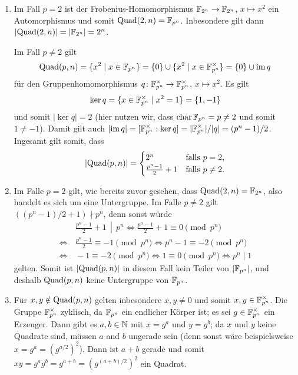\begin{solution}
  \begin{enumerate}
    \item
      Im Fall $p = 2$ ist der Frobenius-Homomorphismus $\mathbb{F}_{2^n} \to \mathbb{F}_{2^n}$, $x \mapsto x^2$ ein Automorphismus und somit $\operatorname{Quad}(2,n) = \mathbb{F}_{p^n}$.
      Inbesondere gilt dann $|{\operatorname{Quad}(2,n)}| = |\mathbb{F}_{2^n}| = 2^n$.
      
      Im Fall $p \neq 2$ gilt
      \[
          \operatorname{Quad}(p,n)
        = \{ x^2 \mid x \in \mathbb{F}_{p^n} \}
        = \{0\} \cup \{x^2 \mid x \in \mathbb{F}_{p^n}^\times\}
        = \{0\} \cup \operatorname{im} q
      \]
      für den Gruppenhomomorphismus $q \colon \mathbb{F}_{p^n}^\times \to \mathbb{F}_{p^n}^\times$, $x \mapsto x^2$.
      Es gilt
      \[
          \ker q
        = \{x \in \mathbb{F}_{p^n}^\times \mid x^2 = 1\}
        = \{1,-1\}
      \]
      und somit $|{\ker q}| = 2$ (hier nutzen wir, dass $\operatorname{char} \mathbb{F}_{p^n} = p \neq 2$ und somit $1 \neq -1$).
      Damit gilt auch $|{\operatorname{im} q}| = [\mathbb{F}_{p^n}^\times : \ker q] = |\mathbb{F}_{p^n}^\times|/|q| = (p^n - 1)/2$.
      Ingesamt gilt somit, dass
      \[
          |{\operatorname{Quad}(p,n)}| =
          \begin{cases}
            2^n                   & \text{falls $p = 2$},     \\
            \frac{p^n - 1}{2} + 1 & \text{falls $p \neq 2$}.
          \end{cases}
      \]
      
    \item
      Im Falle $p = 2$ gilt, wie bereits zuvor gesehen, dass $\operatorname{Quad}(2,n) = \mathbb{F}_{2^n}$, also handelt es sich um eine Untergruppe.
      Im Falle $p \neq 2$ gilt $((p^n - 1)/2 + 1) \nmid p^n$, denn sonst würde
      \begin{align*}
            &\, \left. \frac{p^n - 1}{2} + 1 \,\middle|\, p^n \right.
        \iff    \frac{p^n - 1}{2} + 1 \equiv 0 \pmod{p^n}
        \\
        \iff&\, \frac{p^n - 1}{2} \equiv - 1 \pmod{p^n}
        \iff    p^n - 1 \equiv -2 \pmod{p^n}
        \\
        \iff&\, -1 \equiv -2 \pmod{p^n}
        \iff    1 \equiv 0  \pmod{p^n}
        \iff    p^n \mid 1
      \end{align*}
      gelten.
      Somit  ist $|{\operatorname{Quad}(p,n)}|$ in diesem Fall kein Teiler von $|\mathbb{F}_{p^n}|$, und deshalb $\operatorname{Quad}(p,n)$ keine Untergruppe von $\mathbb{F}_{p^n}$.
      
    \item
      Für $x, y \notin \operatorname{Quad}(p,n)$ gelten inbesondere $x, y \neq 0$ und somit $x, y \in \mathbb{F}_{p^n}^\times$.
      Die Gruppe $\mathbb{F}_{p^n}^\times$ zyklisch, da $\mathbb{F}_{p^n}$ ein endlicher Körper ist;
      es sei $g \in \mathbb{F}_{p^n}^\times$ ein Erzeuger.
      Dann gibt es $a, b \in \mathbb{N}$ mit $x = g^a$ und $y = g^b$;
      da $x$ und $y$ keine Quadrate sind, müssen $a$ and $b$ ungerade sein (denn sonst wäre beispielsweise $x = g^a = (g^{a/2})^2$).
      Dann ist $a+b$ gerade und somit $xy = g^a g^b = g^{a+b} = (g^{(a+b)/2})^2$ ein Quadrat.
  \end{enumerate}
\end{solution}



